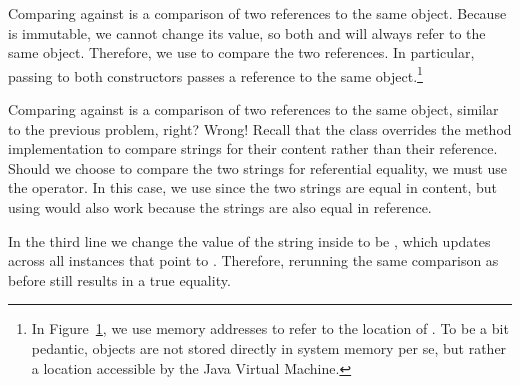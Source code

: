 Comparing  against  is a comparison of two references to the same object. Because  is immutable, we cannot change its value, so both  and  will always refer to the same object. Therefore, we use  to compare the two references. In particular, passing  to both constructors passes a reference to the same object.\footnote{In Figure~\ref{fig:memoryref}, we use memory addresses to refer to the location of . To be a bit pedantic, objects are not stored directly in system memory per se, but rather a location accessible by the Java Virtual Machine.}
\begin{figure}[H]
\label{fig:memoryref}
\end{figure}

Comparing  against  is a comparison of two references to the same object, similar to the previous problem, right? Wrong! Recall that the  class overrides the  method implementation to compare strings for their content rather than their reference. Should we choose to compare the two strings for referential equality, we must use the \ttt{==} operator. In this case, we use  since the two strings are equal in content, but using \ttt{==} would also work because the strings are also equal in reference.

In the third line we change the value of the string inside  to be , which updates across all instances that point to . Therefore, rerunning the same comparison as before still results in a true equality.

